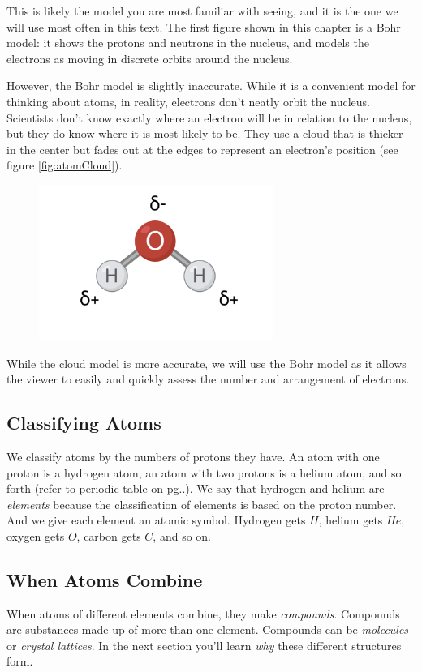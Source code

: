 This is likely the model you are most familiar with seeing, and it is the one we
will use most often in this text. The first figure shown in this chapter is a Bohr
model: it shows the protons and neutrons in the nucleus, and models the electrons 
as moving in discrete orbits around the nucleus. 

However, the Bohr model is slightly inaccurate. While it is a convenient model for
thinking about atoms, in reality, electrons don't neatly orbit the nucleus.
Scientists don't know exactly where an electron will be in relation to the
nucleus, but they do know where it is most likely to be. They use a cloud that is
thicker in the center but fades out at the edges to represent an electron's
position (see figure \ref{fig:atomCloud}).

\begin{figure}
\noindent\includegraphics[width=3in]{water_polar.png}
\caption{}
\label{fig:water_polar}
\end{figure}

While the cloud model is more accurate, we will use the Bohr model as it
allows the viewer to easily and quickly assess the number and arrangement of
electrons.

\subsection{Classifying Atoms}

We classify atoms by the numbers of protons they have. An atom with one proton
is a hydrogen atom, an atom with two protons is a helium atom, and so forth
(refer to periodic table on pg..). We say that hydrogen and helium are \textit{
elements} because the classification of elements is based on the proton number.
And we give each element an atomic symbol. Hydrogen gets $H$, helium gets $He$,
oxygen gets $O$, carbon gets $C$, and so on.

\subsection{When Atoms Combine}
When atoms of different elements combine, they make \textit{compounds}. Compounds
are substances made up of more than one element. Compounds can be 
\textit{molecules} or \textit{crystal lattices}. In the next section you'll learn
\textit{why} these different structures form. 

